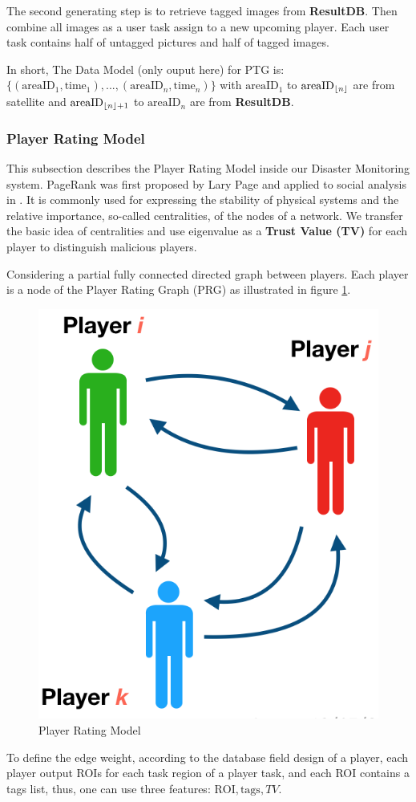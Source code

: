 The second generating step is to retrieve tagged images from \textbf{ResultDB}. Then combine
all images as a user task assign to a new upcoming player. Each user task contains 
half of untagged pictures and half of tagged images.

In short, The Data Model (only ouput here) for PTG is:
$\{(\text{areaID}_1, \text{time}_1), ..., (\text{areaID}_n, \text{time}_n)\}$
with $\text{areaID}_1$ to $\text{areaID}_{\lfloor n\rfloor}$ are from satellite and 
$\text{areaID}_{\lfloor n\rfloor+1}$ to $\text{areaID}_{n}$ are from \textbf{ResultDB}.

\subsubsection{Player Rating Model}

This subsection describes the Player Rating Model inside our Disaster Monitoring system.
PageRank was first proposed by Lary Page \cite{page1999pagerank} and applied to social analysis in \cite{bonacich2001eigenvector}. 
It is commonly used for expressing the stability of physical systems and the relative importance, 
so-called centralities, of the nodes of a network. We transfer the basic idea of centralities 
and use eigenvalue as a \textbf{Trust Value (TV)} for each player to distinguish malicious players.

Considering a partial fully connected directed graph between players. 
Each player is a node of the Player Rating Graph (PRG) as illustrated in figure \ref{fig:graph}.

\begin{figure}[htp]
\centering
\includegraphics[width=0.3\columnwidth]{figures/graph}
\caption{Player Rating Model}
\label{fig:graph}
\end{figure}

To define the edge weight, according to the database field design of a player, each player
output ROIs for each task region of a player task, and each ROI contains a tags list, thus, 
one can use three features: $\text{ROI}, \text{tags}, TV$.

